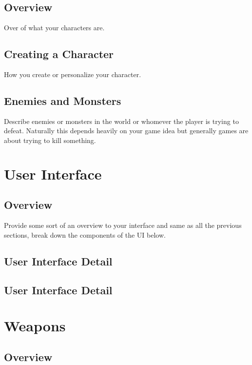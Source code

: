 \documentclass[a4paper]{report}
\begin{document}
	\section{Overview}

		Over of what your characters are.

	\section{Creating a Character}

		How you create or personalize your character.

	\section{Enemies and Monsters}

		Describe enemies or monsters in the world or whomever the player is trying to defeat.  Naturally this depends heavily on your game idea but generally games are about trying to kill something.

\chapter{User Interface}

	\section{Overview}

		Provide some sort of an overview to your interface and same as all the previous sections, break down the components of the UI below.

	\section{User Interface Detail}

	\section{User Interface Detail}

\chapter{Weapons}

	\section{Overview}
\end{document}

